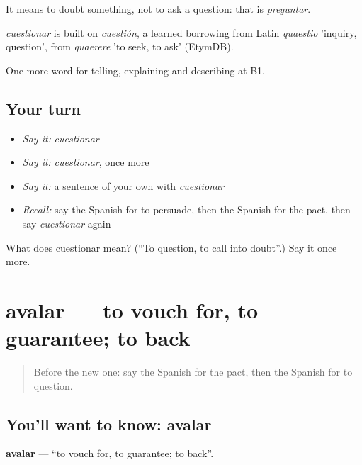 It means to doubt something, not to ask a question: that is \emph{preguntar}.

\begin{cousinweb}
\emph{cuestionar} is built on \emph{cuestión}, a learned borrowing from Latin \emph{quaestio} 'inquiry, question', from \emph{quaerere} 'to seek, to ask' (EtymDB).
\end{cousinweb}

\begin{grammarlens}[title={What you've built}]
One more word for telling, explaining and describing at B1.
\end{grammarlens}

\subsection*{Your turn}
\begin{itemize}
\raggedright
  \item \emph{Say it:} \emph{cuestionar}
  \item \emph{Say it:} \emph{cuestionar}, once more
  \item \emph{Say it:} a sentence of your own with \emph{cuestionar}
  \item \emph{Recall:} say the Spanish for to persuade, then the Spanish for the pact, then say \emph{cuestionar} again
\end{itemize}

\begin{tcolorbox}[breakable,colback=teal!4,colframe=teal!35!black,title={Before you move on}]
What does cuestionar mean? (\textquotedblleft{}To question, to call into doubt\textquotedblright{}.) Say it once more.
\end{tcolorbox}
\section[avalar]{avalar — to vouch for, to guarantee; to back}

\label{lesson:ES-C635-avalar}



\begin{quote}
Before the new one: say the Spanish for the pact, then the Spanish for to question.
\end{quote}

\subsection*{You'll want to know: avalar}
\textbf{avalar} — \textquotedblleft{}to vouch for, to guarantee; to back\textquotedblright{}.

